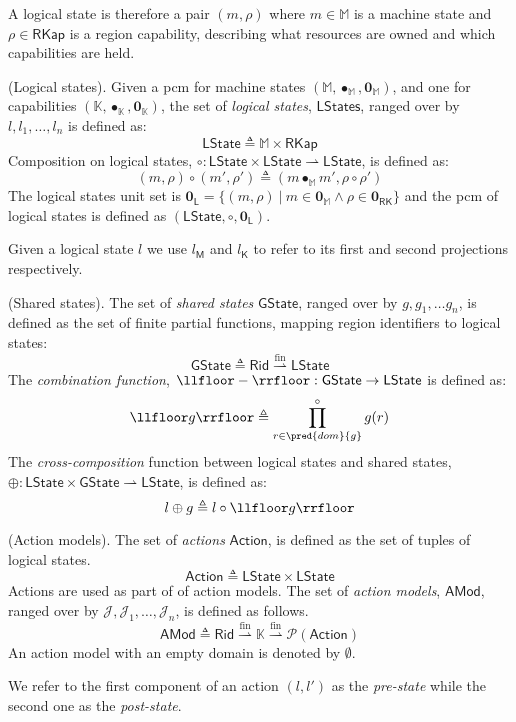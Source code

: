 A logical state is therefore a pair $(m, \rho)$ where $m \in \mathbb{M}$ is a machine state and $\rho \in \mathsf{RKap}$ is a region capability, describing what resources are owned and which capabilities are held.
\begin{defn}
	(Logical states).
	Given a pcm for machine states $(\mathbb{M}, \bullet_\mathbb{M}, \mathbf{0}_\mathbb{M})$, and one for capabilities $(\mathbb{K}, \bullet_\mathbb{K}, \mathbf{0}_\mathbb{K})$, the set of \emph{logical states}, $\mathsf{LStates}$, ranged over by $l, l_1, \ldots, l_n$ is defined as:
	\[
		\mathsf{LState} \triangleq \mathbb{M} \times \mathsf{RKap}
	\]
	Composition on logical states, $\circ : \mathsf{LState} \times \mathsf{LState} \rightharpoonup \mathsf{LState}$, is defined as:
	\[
		(m, \rho) \circ (m', \rho') \triangleq (m \bullet_\mathbb{M} m', \rho \circ \rho')
	\]
	The logical states unit set is $\mathbf{0}_\mathsf{L} = \{ (m, \rho)\ |\ m \in \mathbf{0}_\mathbb{M} \land \rho \in \mathbf{0}_\mathsf{RK} \}$ and the pcm of logical states is defined as $(\mathsf{LState}, \circ, \mathbf{0}_\mathsf{L})$.
\end{defn}
Given a logical state $l$ we use $l_\mathsf{M}$ and $l_\mathsf{K}$ to refer to its first and second projections respectively.

\begin{defn}
	(Shared states).
	The set of \emph{shared states} $\mathsf{GState}$, ranged over by $g, g_1, \ldots g_n$, is defined as the set of finite partial functions, mapping region identifiers to logical states:
	\[
		\mathsf{GState} \triangleq \mathsf{Rid} \overset{\text{fin}}{\rightharpoonup} \mathsf{LState}
	\]
	The \emph{combination function}, $\llfloor - \rrfloor : \mathsf{GState} \rightarrow \mathsf{LState}$ is defined as:
	\[
		\llfloor g \rrfloor \triangleq \prod^{\circ}_{r \in \pred{dom}{g}} g(r)
	\]
	The \textit{cross-composition} function between logical states and shared states, $\oplus : \mathsf{LState} \times \mathsf{GState} \rightharpoonup \mathsf{LState}$, is defined as:
	\[
		l \oplus g \triangleq l \circ \llfloor g \rrfloor
	\]
\end{defn}

\begin{defn}
	(Action models).
	The set of \emph{actions} $\mathsf{Action}$, is defined as the set of tuples of logical states.
	\[
		\mathsf{Action} \triangleq \mathsf{LState} \times \mathsf{LState}
	\]
	Actions are used as part of of action models. The set of \emph{action models}, $\mathsf{AMod}$, ranged over by $\mathcal{J}, \mathcal{J}_1, \ldots, \mathcal{J}_n$, is defined as follows.
	\[
		\mathsf{AMod} \triangleq \mathsf{Rid} \overset{\text{fin}}{\rightharpoonup} \mathbb{K} \overset{\text{fin}}{\rightharpoonup} \mathcal{P}(\mathsf{Action})
	\]
	An action model with an empty domain is denoted by $\emptyset$.
\end{defn}
We refer to the first component of an action $(l, l')$ as the \emph{pre-state} while the second one as the \emph{post-state}. 


